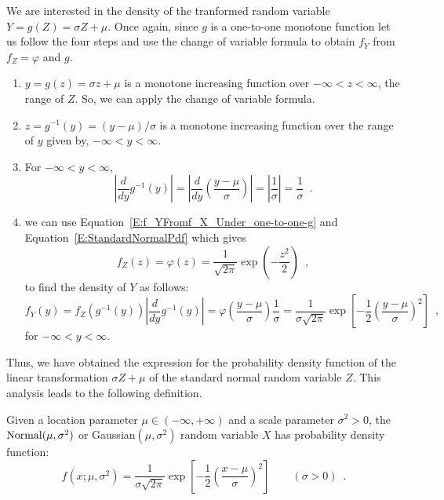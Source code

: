 \begin{example}
We are interested in the density of the tranformed random variable $Y=g(Z)=\sigma Z + \mu$.  
Once again, since $g$ is a one-to-one monotone function let us follow the four steps and use the change of variable formula to obtain $f_Y$ from $f_Z=\varphi$ and $g$.
\begin{enumerate}
\item $y=g(z)=\sigma z + \mu$ is a monotone increasing function over $-\infty < z < \infty$, the range of $Z$.  
So, we can apply the change of variable formula. 
\item $z=g^{-1}(y)=(y - \mu) / \sigma$ is a monotone increasing function over the range of $y$ given by, %
$-\infty < y < \infty$.  
\item For $-\infty < y < \infty$,
\[
 \left\vert \frac{d}{dy} g^{-1}(y) \right\vert 
= \left\vert \frac{d}{dy} \left( \frac{y - \mu}{\sigma} \right) \right\vert 
= \left\vert \frac{1}{\sigma} \right\vert = \frac{1}{\sigma} \enspace .
\]
\item we can use Equation~\eqref{E:f_YFromf_X_Under_one-to-one-g} and Equation~\eqref{E:StandardNormalPdf} which gives
$$f_Z(z) = \varphi(z) = \frac{1}{\sqrt{2\pi}} \exp{\left( -\frac{z^2}{2}\right)} \enspace,$$
to find the density of $Y$ as follows:
\[
f_Y(y) = f_Z \left( g^{-1}(y) \right) \left\vert \frac{d}{dy} g^{-1}(y) \right\vert 
= \varphi \left( \frac{y - \mu}{\sigma} \right) \frac{1}{\sigma}
= \frac{1}{\sigma \sqrt{2 \pi}} \exp \left[-\frac{1}{2} \left( \frac{y-\mu}{\sigma} \right)^2 \right] \enspace ,
\]
for $-\infty < y < \infty$. 
\end{enumerate}
Thus, we have obtained the expression for the probability density function of the linear transformation $\sigma Z + \mu$ of the standard normal random variable $Z$.  This analysis leads to the following definition.
\end{example}


\begin{framed}

\begin{model}
Given a location parameter $\mu \in (-\infty, +\infty)$ and a scale parameter $\sigma^2 > 0$, the $\mbox{{\rm Normal}}(\mu,\sigma^2)$ or Gaussian$(\mu,\sigma^2)$ random variable $X$ has probability density function:
\begin{equation}\label{eqn:norm_pdf}
f(x; \mu,
  \sigma^2)=\frac{1}{\sigma\sqrt{2\pi}}\exp\left[-\frac{1}{2}\left(\frac{x-\mu}{\sigma}\right)^2\right]\qquad(\sigma >0) \enspace .
\end{equation}
\end{model}
\end{framed}

